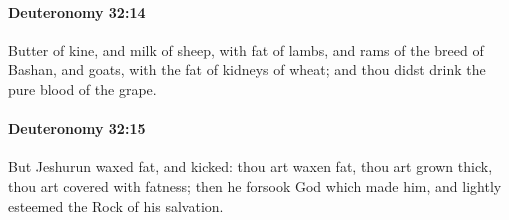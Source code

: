 		\paragraph{Deuteronomy 32:14} %
			\label{DEUTERONOMY-32-14}

			Butter of kine, and milk of sheep, with fat of lambs, and rams of the breed of Bashan, and goats, with the fat of kidneys of wheat; and thou didst drink the pure blood of the grape.


		\paragraph{Deuteronomy 32:15} %
			\label{DEUTERONOMY-32-15}

			But Jeshurun waxed fat, and kicked: thou art waxen fat, thou art grown thick, thou art covered with fatness; then he forsook God which made him, and lightly esteemed the Rock of his salvation.

